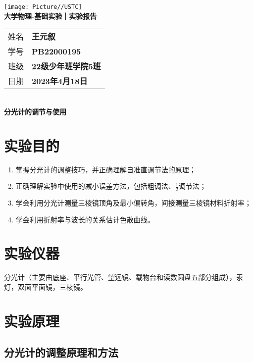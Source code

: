 \documentclass[10pt,a4paper]{article}	%
\newcommand{\nexp}{分光计的调节与使用}
\begin{document}
	\vspace*{-5em}
	\begin{center}
		\texttt{[image: Picture//USTC]}\\
		\Large \textbf{大学物理-基础实验｜实验报告}\\[5mm]

		\normalsize
		\begin{tabular}{ll}
			姓名 & \textbf{王元叙}\\
			学号 & \textbf{PB22000195}\\
			班级 & \textbf{22级少年班学院5班}\\
			日期 & \textbf{2023年4月18日}\\	
		\end{tabular}\\[5mm]

		\LARGE \textbf{\nexp}\\[5mm]	

	\end{center}

	\section{实验目的}

	\begin{enumerate}
		\item 掌握分光计的调整技巧，并正确理解自准直调节法的原理；
		\item 正确理解实验中使用的减小误差方法，包括粗调法、$\frac{1}{2}$调节法；
		\item 学会利用分光计测量三棱镜顶角及最小偏转角，间接测量三棱镜材料折射率；
		\item 学会利用折射率与波长的关系估计色散曲线。
	
	\end{enumerate}

	\section{实验仪器}

	分光计（主要由底座、平行光管、望远镜、载物台和读数圆盘五部分组成），汞灯，双面平面镜，三棱镜。

	\section{实验原理}

	\subsection{分光计的调整原理和方法}
\end{document}
